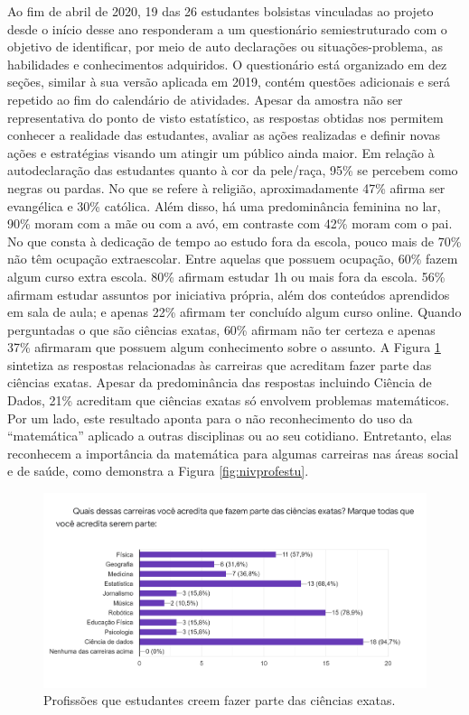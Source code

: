 \documentclass[
]{book}
\begin{document}
Ao fim de abril de 2020, 19 das 26 estudantes bolsistas vinculadas ao projeto desde o início desse ano responderam a um questionário semiestruturado com o objetivo de identificar, por meio de auto declarações ou situações-problema, as habilidades e conhecimentos adquiridos. O questionário está organizado em dez seções, similar à sua versão aplicada em 2019, contém questões adicionais e será repetido ao fim do calendário de atividades. Apesar da amostra não ser representativa do ponto de visto estatístico, as respostas obtidas nos permitem conhecer a realidade das estudantes, avaliar as ações realizadas e definir novas ações e estratégias visando um atingir um público ainda maior.
Em relação à autodeclaração das estudantes quanto à cor da pele/raça, 95\% se percebem como negras ou pardas. No que se refere à religião, aproximadamente 47\% afirma ser evangélica e 30\% católica. Além disso, há uma predominância feminina no lar, 90\% moram com a mãe ou com a avó, em contraste com 42\% moram com o pai.
No que consta à dedicação de tempo ao estudo fora da escola, pouco mais de 70\% não têm ocupação extraescolar. Entre aquelas que possuem ocupação, 60\% fazem algum curso extra escola. 80\% afirmam estudar 1h ou mais fora da escola. 56\% afirmam estudar assuntos por iniciativa própria, além dos conteúdos aprendidos em sala de aula; e apenas 22\% afirmam ter concluído algum curso online.
Quando perguntadas o que são ciências exatas, 60\% afirmam não ter certeza e apenas 37\% afirmaram que possuem algum conhecimento sobre o assunto. A Figura \ref{fig:profestu} sintetiza as respostas relacionadas às carreiras que acreditam fazer parte das ciências exatas. Apesar da predominância das respostas incluindo Ciência de Dados, 21\% acreditam que ciências exatas só envolvem problemas matemáticos. Por um lado, este resultado aponta para o não reconhecimento do uso da ``matemática'' aplicado a outras disciplinas ou ao seu cotidiano. Entretanto, elas reconhecem a importância da matemática para algumas carreiras nas áreas social e de saúde, como demonstra a Figura \ref{fig:nivprofestu}.

\begin{figure}

{\centering \includegraphics[width=1\linewidth,height=0.8\textheight]{images/image40} 

}

\caption{Profissões que estudantes creem fazer parte das ciências exatas.}\label{fig:profestu}
\end{figure}
\end{document}
